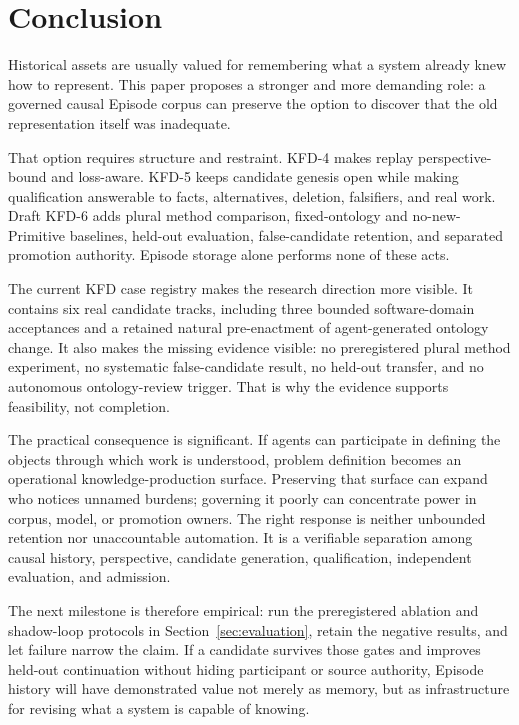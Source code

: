 \section{Conclusion}
\label{sec:conclusion}

Historical assets are usually valued for remembering what a system already
knew how to represent. This paper proposes a stronger and more demanding role:
a governed causal Episode corpus can preserve the option to discover that the
old representation itself was inadequate.

That option requires structure and restraint. KFD-4 makes replay
perspective-bound and loss-aware. KFD-5 keeps candidate genesis open while
making qualification answerable to facts, alternatives, deletion, falsifiers,
and real work. Draft KFD-6 adds plural method comparison, fixed-ontology and
no-new-Primitive baselines, held-out evaluation, false-candidate retention,
and separated promotion authority. Episode storage alone performs none of
these acts.

The current KFD case registry makes the research direction more visible. It
contains six real candidate tracks, including three bounded software-domain
acceptances and a retained natural pre-enactment of agent-generated ontology
change. It also makes the missing evidence visible: no preregistered plural
method experiment, no systematic false-candidate result, no held-out transfer,
and no autonomous ontology-review trigger. That is why the evidence supports
feasibility, not completion.

The practical consequence is significant. If agents can participate in
defining the objects through which work is understood, problem definition
becomes an operational knowledge-production surface. Preserving that surface
can expand who notices unnamed burdens; governing it poorly can concentrate
power in corpus, model, or promotion owners. The right response is neither
unbounded retention nor unaccountable automation. It is a verifiable
separation among causal history, perspective, candidate generation,
qualification, independent evaluation, and admission.

The next milestone is therefore empirical: run the preregistered ablation and
shadow-loop protocols in Section~\ref{sec:evaluation}, retain the negative
results, and let failure narrow the claim. If a candidate survives those gates
and improves held-out continuation without hiding participant or source
authority, Episode history will have demonstrated value not merely as memory,
but as infrastructure for revising what a system is capable of knowing.
